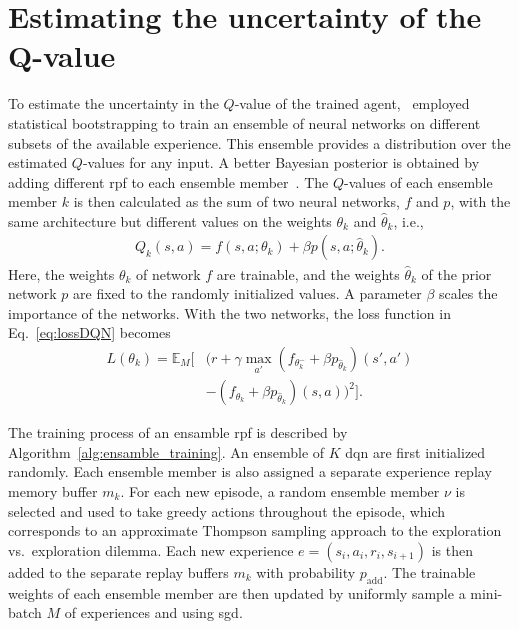 \section{Estimating the uncertainty of the Q-value}
\label{ch:ensamble}
To estimate the uncertainty in the $Q$-value of the trained agent, \paperEnsamble \ employed statistical bootstrapping to train an ensemble of neural networks on different subsets of the available experience. This ensemble provides a distribution over the estimated $Q$-values for any input. A better Bayesian posterior is obtained by adding different \gls{rpf} to each ensemble member~\cite{Osband2018}.
The $Q$-values of each ensemble member $k$ is then calculated as the sum of two neural networks, $f$ and $p$, with the same architecture but different values on the weights  $\theta_k$ and $\hat{\theta}_k$, i.e.,
%
\begin{align}
	Q_k(s,a) = f(s,a;\theta_k) + \beta p(s,a;\hat{\theta}_k).
\end{align}
Here, the weights $\theta_k$ of network $f$ are trainable, and the weights $\hat{\theta}_k$ of the prior network $p$ are fixed to the randomly initialized values. A parameter $\beta$ scales the importance of the networks. With the two networks, the loss function in Eq.~\ref{eq:lossDQN} becomes
%
\begin{align}
	\label{eq:loss_boot}
	L(\theta_k) = \mathbb{E}_M \Big[ & (r + \gamma \max_{a'} (f_{\theta^-_k}+\beta p_{\hat{\theta}_k})(s',a') \nonumber \\
	& - (f_{\theta_k}+ \beta p_{\hat{\theta}_k})(s,a) )^2 \Big].
\end{align} 

%

The training process of an ensamble \gls{rpf} is described by Algorithm~\ref{alg:ensamble_training}. 
An ensemble of $K$ \gls{dqn} are first initialized randomly. Each ensemble member is also assigned a separate experience replay memory buffer $m_k$. 
For each new episode, a random ensemble member $\nu$ is selected and used to take greedy actions throughout the episode, which corresponds to an approximate Thompson sampling approach to the exploration vs.~exploration dilemma.
Each new experience $e = (s_i, a_i, r_i, s_{i+1})$ is then added to the separate replay buffers $m_k$ with probability $p_\mathrm{add}$. The trainable weights of each ensemble member are then updated by uniformly sample a mini-batch $M$ of experiences and using \gls{sgd}.


